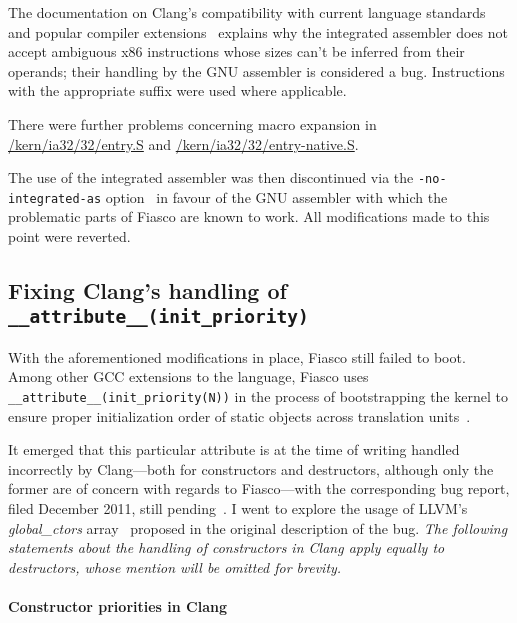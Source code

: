 The documentation on Clang's compatibility with current language standards and
popular compiler extensions~\cite[Inline assembly]{clang-compatibility}
explains why the integrated assembler does not accept ambiguous x86
instructions whose sizes can't be inferred from their operands; their handling
by the GNU assembler is considered a bug. Instructions with the appropriate
suffix were used where applicable.

There were further problems concerning macro expansion in
\url{/kern/ia32/32/entry.S} and \url{/kern/ia32/32/entry-native.S}.

The use of the integrated assembler was then discontinued via the
\texttt{-no-integrated-as} option~\cite{manclang} in favour of the GNU
assembler with which the problematic parts of Fiasco are known to work.
All modifications made to this point were reverted.

\subsection{Fixing Clang's handling of \lstinline{__attribute__(init_priority)}}

With the aforementioned modifications in place, Fiasco still failed to boot. Among other GCC
extensions to the \CPP language, Fiasco uses
\lstinline{__attribute__(init_priority(N))} in the process of bootstrapping the kernel to ensure proper
initialization order of static objects across translation
units~\cite{gcc-initpriority}.

It emerged
that this particular attribute is at the time of writing handled incorrectly by
Clang—both for constructors and destructors, although only the former are of concern with regards to Fiasco—with the corresponding
bug report, filed December 2011, still
pending~\cite{initpriority-bug}. I went to explore the usage of LLVM's
\emph{global\_ctors} array~\cite{langref-globalctors} proposed in the original
description of the bug. \emph{The following statements
about the handling of constructors in Clang apply equally
to destructors, whose mention will be omitted for brevity.}


\paragraph{Constructor priorities in Clang}

